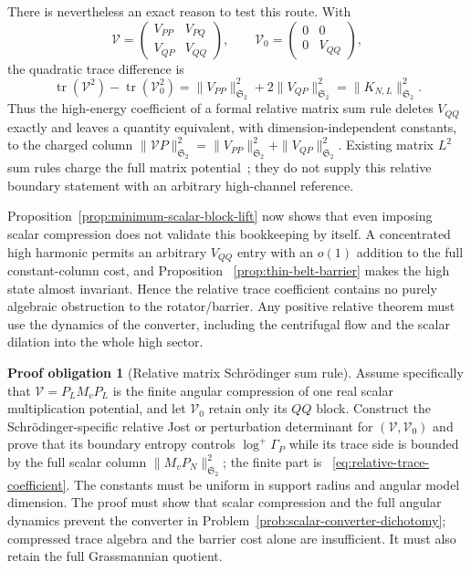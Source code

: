 \documentclass[11pt]{article}
\newcommand{\HS}{\mathfrak S_2}
\DeclareMathOperator{\tr}{tr}
\theoremstyle{definition}
\newtheorem{problem}[theorem]{Proof obligation}
\theoremstyle{remark}
\begin{document}
There is nevertheless an exact reason to test this route.  With
\begin{equation}
 \mathcal V=\begin{pmatrix}V_{PP}&V_{PQ}\\V_{QP}&V_{QQ}\end{pmatrix},
 \qquad
 \mathcal V_0=\begin{pmatrix}0&0\\0&V_{QQ}\end{pmatrix},
\end{equation}
the quadratic trace difference is
\begin{equation}
 \tr(\mathcal V^2)-\tr(\mathcal V_0^2)
 =\|V_{PP}\|_{\HS}^2+2\|V_{QP}\|_{\HS}^2
 =\|K_{N,L}\|_{\HS}^2.
 \label{eq:relative-trace-coefficient}
\end{equation}
Thus the high-energy coefficient of a formal relative matrix sum rule deletes
$V_{QQ}$ exactly and leaves a quantity equivalent, with dimension-independent
constants, to the charged column
$\|\mathcal VP\|_{\HS}^2=\|V_{PP}\|_{\HS}^2+
\|V_{QP}\|_{\HS}^2$.  Existing matrix $L^2$ sum rules charge the full matrix
potential~\cite{MolchanovVainberg2004}; they do not supply this relative
boundary statement with an arbitrary high-channel reference.

Proposition~\ref{prop:minimum-scalar-block-lift} now shows that even imposing
scalar compression does not validate this bookkeeping by itself.  A
concentrated high harmonic permits an arbitrary $V_{QQ}$ entry with an
$o(1)$ addition to the full constant-column cost, and Proposition
~\ref{prop:thin-belt-barrier} makes the high state almost invariant.  Hence the
relative trace coefficient contains no purely algebraic obstruction to the
rotator/barrier.  Any positive relative theorem must use the dynamics of the
converter, including the centrifugal flow and the scalar dilation into the
whole high sector.

\begin{problem}[Relative matrix Schr\"odinger sum rule]
\label{prob:relative-matrix-sum-rule}
Assume specifically that
$\mathcal V=P_LM_vP_L$ is the finite angular compression of one real scalar
multiplication potential, and let $\mathcal V_0$ retain only its $QQ$ block.
Construct the Schr\"odinger-specific relative Jost or perturbation determinant
for $(\mathcal V,\mathcal V_0)$ and prove that its boundary entropy controls
$\log^+\Gamma_P$ while its trace side is bounded by the full scalar column
$\|M_vP_N\|_{\HS}^2$; the finite part is
~\eqref{eq:relative-trace-coefficient}.  The constants must be uniform in
support radius and angular model dimension.  The proof must show that scalar
compression and the full angular dynamics prevent the converter in
Problem~\ref{prob:scalar-converter-dichotomy}; compressed trace algebra and the
barrier cost alone are insufficient.  It must also retain the full
Grassmannian quotient.
\end{problem}
\end{document}
